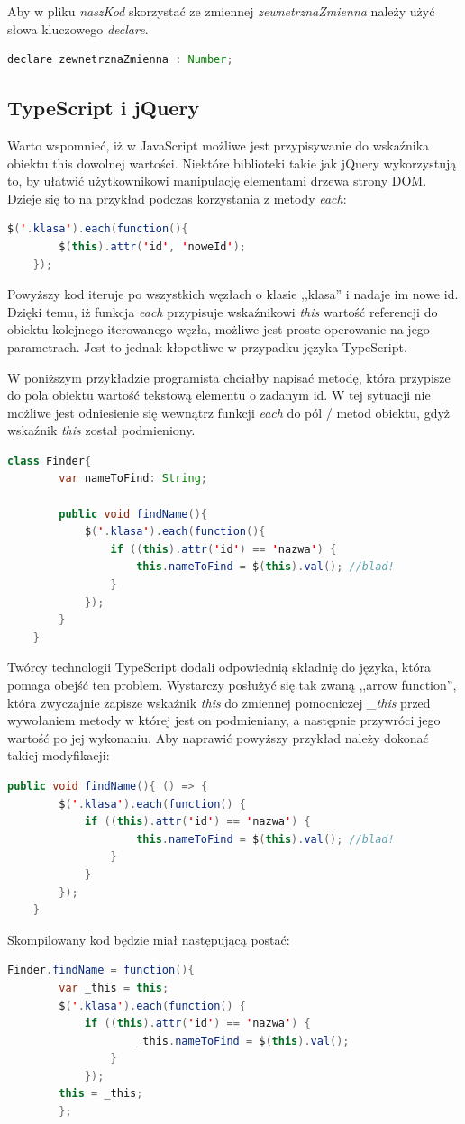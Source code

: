 Aby w pliku \textit{naszKod} skorzystać ze zmiennej \textit{zewnetrznaZmienna} należy użyć słowa kluczowego \textit{declare}.
\begin{lstlisting}[language=Java]
	declare zewnetrznaZmienna : Number;
\end{lstlisting}

\subsection{TypeScript i jQuery}
Warto wspomnieć, iż w JavaScript możliwe jest przypisywanie do wskaźnika obiektu this dowolnej wartości. Niektóre biblioteki takie jak jQuery wykorzystują to, by ułatwić użytkownikowi manipulację elementami drzewa strony DOM. Dzieje się to na przykład podczas korzystania z metody \textit{each}:

\begin{lstlisting}[language=Java]
	$('.klasa').each(function(){
		$(this).attr('id', 'noweId');
	});
\end{lstlisting}
Powyższy kod iteruje po wszystkich węzłach o klasie ,,klasa'' i nadaje im nowe id. Dzięki temu, iż funkcja \textit{each} przypisuje wskaźnikowi \textit{this} wartość referencji do obiektu kolejnego iterowanego węzła, możliwe jest proste operowanie na jego parametrach. Jest to jednak kłopotliwe w przypadku języka TypeScript.

W poniższym przykładzie programista chciałby napisać metodę, która przypisze do pola obiektu wartość tekstową elementu o zadanym id. W tej sytuacji nie możliwe jest odniesienie się wewnątrz funkcji \textit{each} do pól / metod obiektu, gdyż wskaźnik \textit{this} został podmieniony.
\begin{lstlisting}[language=Java]
	class Finder{
		var nameToFind: String;
	
		public void findName(){
			$('.klasa').each(function(){
				if ((this).attr('id') == 'nazwa') {
					this.nameToFind = $(this).val(); //blad!
				}
			});
		}
	}
\end{lstlisting}

Twórcy technologii TypeScript dodali odpowiednią składnię do języka, która pomaga obejść ten problem. Wystarczy posłużyć się tak zwaną ,,arrow function'', która zwyczajnie zapisze wskaźnik \textit{this} do zmiennej pomocniczej \textit{\_this} przed wywołaniem metody w której jest on podmieniany, a następnie przywróci jego wartość po jej wykonaniu. Aby naprawić powyższy przykład należy dokonać takiej modyfikacji:

\begin{lstlisting}[language=Java]
	public void findName(){ () => {
		$('.klasa').each(function() {
			if ((this).attr('id') == 'nazwa') { 
					this.nameToFind = $(this).val(); //blad!
				}
			}
		});
	}
\end{lstlisting}

Skompilowany kod będzie miał następującą postać:
\begin{lstlisting}[language=Java]
	Finder.findName = function(){ 
		var _this = this;
		$('.klasa').each(function() {
			if ((this).attr('id') == 'nazwa') { 
					_this.nameToFind = $(this).val();
				}
			});
		this = _this;
		};
\end{lstlisting}
